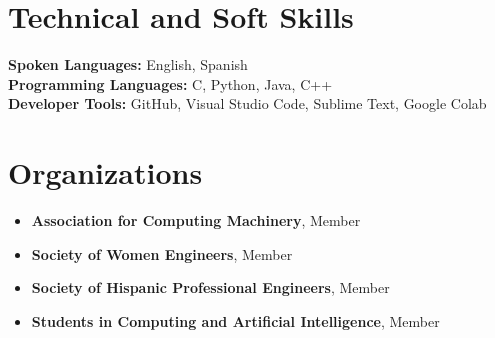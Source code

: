 \documentclass[letterpaper,11pt]{article}
\newcommand{\resumeItem}[1]{
  \item\small{
    {#1 \vspace{-2pt}}
  }
}
\newcommand{\resumeSubHeadingListStart}{\begin{itemize}[leftmargin=0.15in, label={}]}
\newcommand{\resumeSubHeadingListEnd}{\end{itemize}}
\begin{document}
\section{Technical and Soft Skills}
 \begin{itemize}[leftmargin=0.15in, label={}]
    \small{\item{
     \textbf{Spoken Languages:}{ English, Spanish} \\
     \textbf{Programming Languages:}{ C, Python, Java, C++} \\
     \textbf{Developer Tools:}{ GitHub, Visual Studio Code, Sublime Text, Google Colab} \\
    }}
 \end{itemize}

\section{Organizations}

\resumeSubHeadingListStart
    \resumeItem{\textbf{Association for Computing Machinery}, Member}
    \resumeItem{\textbf{Society of Women Engineers}, Member}
    \resumeItem{\textbf{Society of Hispanic Professional Engineers}, Member}
    \resumeItem{\textbf{Students in Computing and Artificial Intelligence}, Member}
\resumeSubHeadingListEnd


\end{document}

